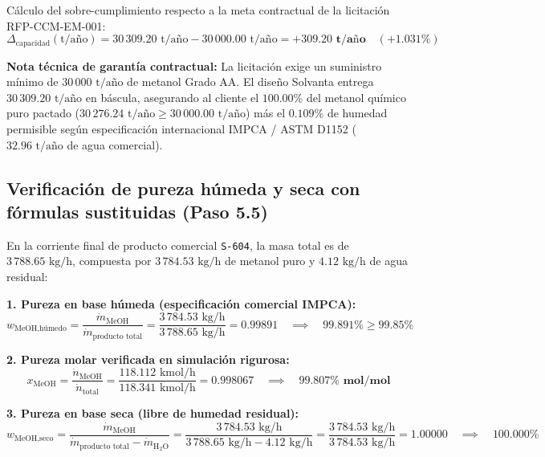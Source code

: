 \documentclass[11pt,letterpaper]{article}
\begin{document}
Cálculo del sobre-cumplimiento respecto a la meta contractual de la licitación RFP-CCM-EM-001:
\begin{equation}
\Delta_{\text{capacidad}}(\text{t/año}) = 30\,309.20\text{ t/año} - 30\,000.00\text{ t/año} = \mathbf{+309.20\text{ t/año}} \quad (\mathbf{+1.031\%})
\end{equation}

\textbf{Nota técnica de garantía contractual:} La licitación exige un suministro mínimo de $30\,000\text{ t/año}$ de metanol Grado AA. El diseño Solvanta entrega $30\,309.20\text{ t/año}$ en báscula, asegurando al cliente el $100.00\%$ del metanol químico puro pactado ($30\,276.24\text{ t/año} \ge 30\,000.00\text{ t/año}$) más el $0.109\%$ de humedad permisible según especificación internacional IMPCA / ASTM D1152 ($32.96\text{ t/año}$ de agua comercial).

\vspace{0.4cm}
\subsection{Verificación de pureza húmeda y seca con fórmulas sustituidas (Paso 5.5)}

En la corriente final de producto comercial \texttt{S-604}, la masa total es de $3\,788.65\text{ kg/h}$, compuesta por $3\,784.53\text{ kg/h}$ de metanol puro y $4.12\text{ kg/h}$ de agua residual:

\textbf{1. Pureza en base húmeda (especificación comercial IMPCA):}
\begin{equation}
w_{\text{MeOH,húmedo}} = \frac{\dot{m}_{\text{MeOH}}}{\dot{m}_{\text{producto total}}} = \frac{3\,784.53\text{ kg/h}}{3\,788.65\text{ kg/h}} = \mathbf{0.99891} \quad \implies \quad \mathbf{99.891\%} \ge 99.85\%
\end{equation}

\textbf{2. Pureza molar verificada en simulación rigurosa:}
\begin{equation}
x_{\text{MeOH}} = \frac{\dot{n}_{\text{MeOH}}}{\dot{n}_{\text{total}}} = \frac{118.112\text{ kmol/h}}{118.341\text{ kmol/h}} = \mathbf{0.998067} \quad \implies \quad \mathbf{99.807\%\text{ mol/mol}}
\end{equation}

\textbf{3. Pureza en base seca (libre de humedad residual):}
\begin{equation}
w_{\text{MeOH,seco}} = \frac{\dot{m}_{\text{MeOH}}}{\dot{m}_{\text{producto total}} - \dot{m}_{\text{H}_2\text{O}}} = \frac{3\,784.53\text{ kg/h}}{3\,788.65\text{ kg/h} - 4.12\text{ kg/h}} = \frac{3\,784.53\text{ kg/h}}{3\,784.53\text{ kg/h}} = \mathbf{1.00000} \quad \implies \quad \mathbf{100.000\%}
\end{equation}
\end{document}
